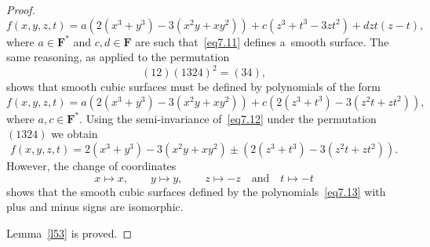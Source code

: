 \documentclass[10pt,a4paper]{amsart}
\begin{document}
\begin{proof}
\begin{equation}
\label{eq7.11}
f(x,y,z,t)=a(2(x^3+y^3)-3(x^2y+xy^2))+c(z^3+t^3-3zt^2)+dzt(z-t),
\end{equation}
where $a \in \mathbf{F}^*$ and $c,d \in \mathbf{F}$ are such that~\eqref{eq7.11} defines a~smooth surface. The same reasoning, as applied to the permutation
$$
(12)(1324)^2=(34),
$$
shows that smooth cubic surfaces must be defined by polynomials of the form
\begin{equation}
\label{eq7.12}
f(x,y,z,t)=a(2(x^3+y^3)-3(x^2y+xy^2))+c(2(z^3+t^3)-3(z^2t+zt^2)),
\end{equation}
where $a,c \in \mathbf{F}^*$. Using the semi-invariance of~\eqref{eq7.12} under the permutation $(1324)$ we obtain
\begin{equation}
\label{eq7.13}
f(x,y,z,t)=2(x^3+y^3)- 3(x^2y+xy^2)\pm (2(z^3+t^3)-3(z^2t+zt^2)).
\end{equation}
However, the change of coordinates
$$
x \mapsto x, \qquad y \mapsto y, \qquad z \mapsto -z \quad\text{and}\quad t \mapsto -t
$$
shows that the smooth cubic surfaces defined by the polynomials~\eqref{eq7.13} with plus and minus signs are isomorphic.

Lemma~\ref{l53} is proved.
\end{proof}
\end{document}

